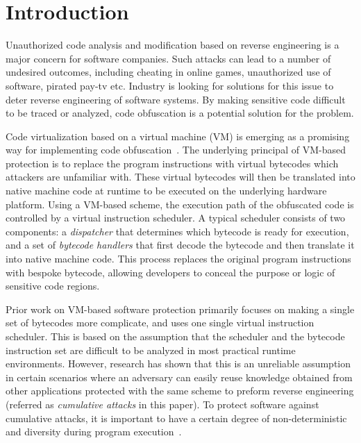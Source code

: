 \section{Introduction}
Unauthorized code analysis and modification based on reverse engineering is a major concern for software companies.
Such attacks can lead to a number of undesired outcomes,
including cheating in online games, unauthorized use of software, pirated pay-tv etc.
Industry is looking for solutions for this issue to deter reverse engineering of software systems.
By making sensitive code difficult to be traced or analyzed, code obfuscation is a potential solution for the problem.

Code virtualization based on a virtual machine (VM) is emerging as a
promising way for implementing code
obfuscation~\cite{1Themida,2CV,3Vmprotect,5fang2011multi,6ming2011software,7wang2014tdvmp,8wang2013nislvmp}.
The underlying principal of VM-based protection is to replace the program
instructions with virtual bytecodes which attackers are unfamiliar with.
These virtual bytecodes will then be translated into native machine code at
runtime to be executed on the underlying hardware platform. Using a VM-based
scheme, the execution path of the obfuscated code is controlled by a virtual
instruction scheduler. A typical scheduler consists of two components: a
\emph{dispatcher} that determines which bytecode is ready for execution, 
and a set of \emph{bytecode handlers} that first decode the bytecode 
and then translate it into native machine code. 
This process replaces the original program instructions with
bespoke bytecode, allowing developers to conceal the purpose or logic of
sensitive code regions.

Prior work on VM-based software protection primarily focuses on making a
single set of bytecodes more complicate, and uses one single virtual
instruction scheduler. This is based on the assumption that the scheduler and
the bytecode instruction set are difficult to be analyzed in most practical
runtime environments. However, research has shown that this is an unreliable
assumption~\cite{10falliere2009inside} in certain scenarios where an
adversary can easily reuse knowledge obtained from other applications
protected with the same scheme to preform reverse engineering (referred as
\emph{cumulative attacks} in this paper). To protect software against
cumulative attacks, it is important to have a certain degree of non-deterministic
and diversity during program execution~\cite{4collberg}.

